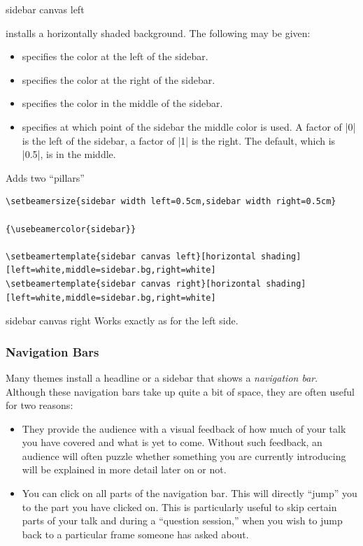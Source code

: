 \begin{element}{sidebar canvas left}
\begin{templateoptions}
    installs a horizontally shaded background. The following  may be given:
    \begin{itemize}
      \item
       specifies the color at the left of the sidebar.
      \item
       specifies the color at the right of the sidebar.
      \item
       specifies the color in the middle of the sidebar.
      \item
       specifies at which point of the sidebar the middle color is used. A factor of |0| is the left of the sidebar, a factor of |1| is the right. The default, which is |0.5|, is in the middle.
    \end{itemize}

    \example
    Adds two ``pillars''

\begin{verbatim}
\setbeamersize{sidebar width left=0.5cm,sidebar width right=0.5cm}

{\usebeamercolor{sidebar}}

\setbeamertemplate{sidebar canvas left}[horizontal shading]
[left=white,middle=sidebar.bg,right=white]
\setbeamertemplate{sidebar canvas right}[horizontal shading]
[left=white,middle=sidebar.bg,right=white]
\end{verbatim}
  \end{templateoptions}
\end{element}

\begin{element}{sidebar canvas right}\yes\no\no
  Works exactly as for the left side.
\end{element}

\subsubsection{Navigation Bars}
\label{section-navigation-bars}

Many themes install a headline or a sidebar that shows a \emph{navigation bar}. Although these navigation bars take up quite a bit of space, they are often useful for two reasons:
\begin{itemize}
\item
  They provide the audience with a visual feedback of how much of your talk you have covered and what is yet to come. Without such feedback, an audience will often puzzle whether something you are currently introducing will be explained in more detail later on or not.
\item
  You can click on all parts of the navigation bar. This will directly ``jump'' you to the part you have clicked on. This is particularly useful to skip certain parts of your talk and during a ``question session,'' when you wish to jump back to a particular frame someone has asked about.
\end{itemize}

